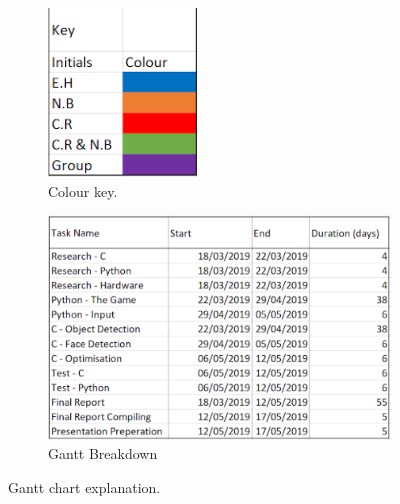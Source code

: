 \begin{figure}[H]
    \centering
    \begin{subfigure}[b]{0.25\textwidth}
        \centering
        \includegraphics[width=\textwidth]{key}
        \caption{Colour key.}
        \label{key}
    \end{subfigure}
    \hfill
    \begin{subfigure}[b]{0.7\textwidth}
        \centering
        \includegraphics[width=\textwidth]{key1}
        \caption{Gantt Breakdown}
        \label{key1}
    \end{subfigure}
    \hfill
    \caption{Gantt chart explanation.}
    \label{ganttkey}
\end{figure}

